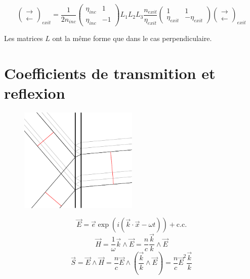 \documentclass[a4paper,english]{article}
\begin{document}
\begin{dmath}
\begin{pmatrix}\rightarrow \\ \leftarrow\end{pmatrix}_{exit} =
\frac{1}{2 n_{inc}} \begin{pmatrix} \eta_{inc} & 1 \\ \eta_{inc} & -1 \end{pmatrix} L_1 L_2 L_3 \frac{n_{exit}}{\eta_{exit}} \begin{pmatrix} 1 & 1 \\ \eta_{exit} & -\eta_{exit} \end{pmatrix}
\begin{pmatrix}\rightarrow \\ \leftarrow\end{pmatrix}_{exit}
\end{dmath}

Les matrices $L$ ont la même forme que dans le cas perpendiculaire.
















\section{Coefficients de transmition et reflexion}
\begin{figure}[H]
	\centering
	\includegraphics[height=5cm]{transmittance.pdf}
\end{figure}

\begin{dmath}
	\vec E = \vec e \exp(i (\vec k \cdot \vec x - \omega t)) + \text{c.c.}
\end{dmath}
\begin{equation}
	\vec H = \frac{1}{\omega} \vec k \wedge \vec E = \frac{n}{c} \frac{\vec k}{k} \wedge \vec E 
\end{equation}
\begin{equation}
	\vec S = \vec E \wedge \vec H = \frac{n}{c} \vec E \wedge (\frac{\vec k}{k} \wedge \vec E) = \frac{n}{c} \vec E^2 \frac{\vec k}{k}
\end{equation}
\end{document}
